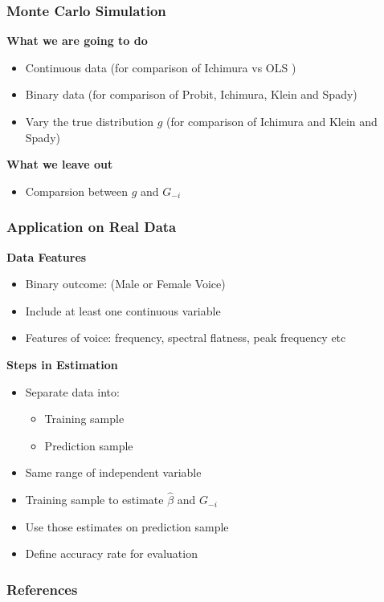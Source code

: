 \documentclass{beamer}
\begin{document}
\begin{frame}[t]
	\frametitle{Monte Carlo Simulation}

	\textbf{What we are going to do}
	\begin{itemize}
		\item Continuous data (for comparison of Ichimura vs OLS )
		\item Binary data (for comparison of Probit, Ichimura, Klein and Spady)
           \item Vary the true distribution $g$ (for comparison of Ichimura and Klein and Spady)
	\end{itemize}
	\textbf{What we leave out}
	\begin{itemize}
		\item Comparsion between $g$ and $ G_{-i} $
	\end{itemize}
	\note{~}
\end{frame}


\begin{frame}
	\frametitle{Application on Real Data}
	
	\textbf{Data Features}
	\begin{itemize}
		\item Binary outcome: (Male or Female Voice)
		\item Include at least one continuous variable
		\item Features of voice: frequency, spectral flatness, peak frequency etc
	\end{itemize}
	\textbf{Steps in Estimation}
	\begin{itemize}
		\item Separate data into:
		\begin{itemize}
			\item Training sample
			\item Prediction sample
		\end{itemize}
		\item Same range of independent variable 
		\item Training sample to estimate $\hat{\beta}$ and $G_{-i}$
		\item Use those estimates on prediction sample
		\item Define accuracy rate for evaluation
	\end{itemize}
	\note{~}
\end{frame}


\begin{frame}[allowframebreaks]
    \frametitle{References}
    \renewcommand{\bibfont}{\normalfont\footnotesize}
    \printbibliography
\end{frame}
\end{document}
